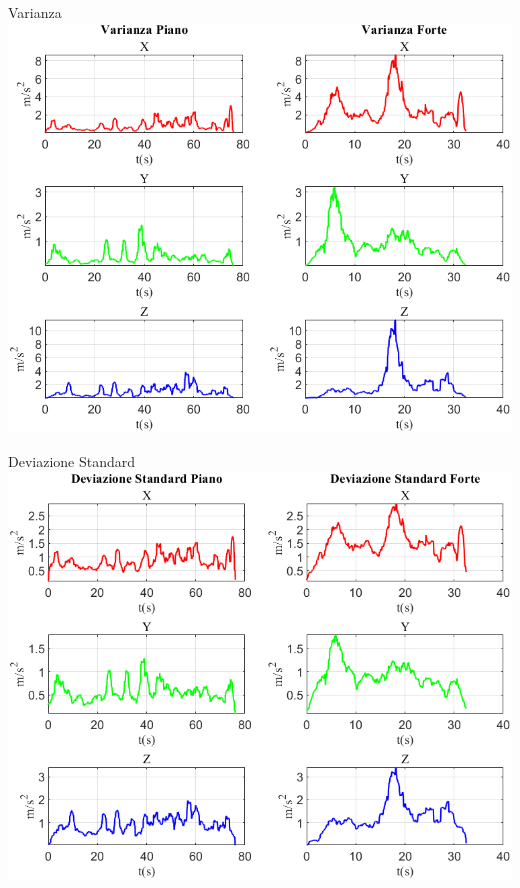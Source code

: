 	\begin{frame}{{Varianza}}
		\centering\includegraphics[height=.8\textheight]{figure/Acc/Varianza}
	\end{frame}
	
	\begin{frame}{{Deviazione Standard}}
		\centering\includegraphics[height=.8\textheight]{figure/Acc/Deviazione Standard}
	\end{frame}
	

